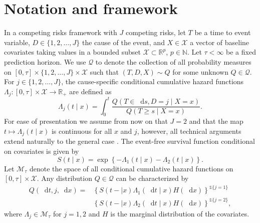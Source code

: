 \documentclass[lineno]{biometrika}
\newcommand{\R}{\mathbb{R}}
\newcommand{\N}{\mathbb{N}}
\newcommand*\diff{\mathop{}\!\mathrm{d}}
\newcommand{\1}{\mathds{1}}
\begin{document}
\section{Notation and framework}
\label{sec:framework}

In a competing risks framework \citep{andersen2012statistical} with
\(J\) competing risks, let \( T\) be a time to event variable,
\(D\in\{1,2,\dots,J\}\) the cause of the event, and $X \in
\mathcal{X}$ a vector of baseline covariates taking values in a
bounded subset \( \mathcal{X} \subset \R^p \), \( p\in\N \). Let
$\tau< \infty$ be a fixed prediction horizon. We use \(\mathcal{Q} \)
to denote the collection of all probability measures on \( [0,\tau]
\times \{1,2,\dots,J\}\times \mathcal{X} \) such that \( (T, D, X) \sim Q \)
for some unknown \( Q \in \mathcal{Q} \). For \(j\in\{1,2,
\dots,J\}\), the cause-specific conditional cumulative hazard
functions \( \Lambda_{j} \colon [0, \tau] \times \mathcal{X}
\rightarrow \R_+ \) are defined as
\begin{equation*}
  \Lambda_{j}(t \mid x) = \int_0^t\frac{  Q(T \in \diff s, D=j \mid X=x )}{Q(T \geq s \mid X=x )}.
\end{equation*} For ease of presentation we assume from now on that
\(J=2\) and that the map \( t\mapsto \Lambda_j(t \mid x) \) is
continuous for all \( x \) and \( j \), however, all technical
arguments extend naturally to the general case
\citep{andersen2012statistical}.  The event-free survival function
conditional on covariates is given by
\begin{equation}
  \label{eq:surv-def}
  S(t \mid x)=\exp\left\{-\Lambda_{1}(t \mid x)-\Lambda_{2}(t \mid x)\right\}.
\end{equation}
Let \( \mathcal{M}_{\tau}\) denote the space of all conditional
cumulative hazard functions on \( [0,\tau] \times\mathcal{X}\). Any
distribution \( Q \in \mathcal{Q} \) can be characterized by
\begin{equation*}
  \label{eq:parametrizeQ}
  \begin{split}
    Q(\diff t,j,\diff x)=& \left\{S(t- \mid x)\Lambda_1(\diff t \mid x)H(\diff x)\right\}^{\1{\{j=1\}}}\\
                         &  \left\{S(t- \mid x)\Lambda_2(\diff t \mid x)H(\diff x)\right\}^{\1{\{j=2\}}},
  \end{split}
\end{equation*}
where \(\Lambda_{j} \in \mathcal{M}_{\tau}\) for \(j=1,2\) and \(H\) is the marginal
distribution of the covariates.
\end{document}
